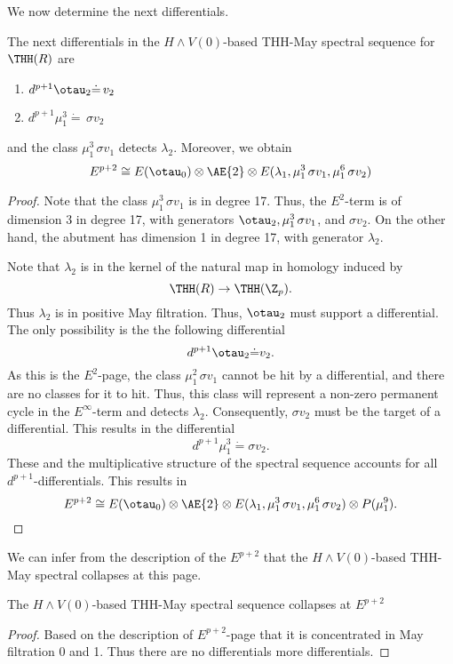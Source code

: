 We now determine the next differentials. 

\begin{prop}
	The next differentials in the $H\wedge V(0)$-based THH-May spectral sequence for $\THH(R)$ are 
	\begin{enumerate}
		\item $d^{p+1}\otau_2\dot{=}\, v_2$
		\item $d^{p+1}\mu_1^3\dot{=}\, \sigma v_2$
	\end{enumerate}
	and the class $\mu_1^3\, \sigma v_1$ detects $\lambda_2$. Moreover, we obtain
	\[
	E^{p+2}\cong E(\otau_0)\otimes \AE{2}\otimes E(\lambda_1, \mu_1^3\, \sigma v_1, \mu_1^6\, \sigma v_2)
	\]
\end{prop}
\begin{proof}
	Note that the class $\mu_1^3\, \sigma v_1$ is in degree 17. Thus, the $E^2$-term is of dimension 3 in degree 17, with generators $\otau_2, \mu_1^3\, \sigma v_1$, and $\sigma v_2$. On the other hand, the abutment has dimension 1 in degree 17, with generator $\lambda_2$. 

Note that $\lambda_2$ is in the kernel of the natural map in homology induced by 
\[
\THH(R)\to \THH(\Z_p).
\]
Thus $\lambda_2$ is in positive May filtration. Thus, $\otau_2$ must support a differential. The only possibility is the the following differential
\[
d^{p+1}\otau_2\dot{=} v_2.
\]
As this is the $E^2$-page, the class $\mu_1^2\, \sigma v_1$ cannot be hit by a differential, and there are no classes for it to hit. Thus, this class will represent a non-zero permanent cycle in the $E^\infty$-term and detects $\lambda_2$. Consequently, $\sigma v_2$ must be the target of a differential. This results in the differential 
\[
d^{p+1}\mu_1^3\dot{=} \sigma v_2.
\] 
These and the multiplicative structure of the spectral sequence accounts for all $d^{p+1}$-differentials. This results in 
\[
E^{p+2}\cong E(\otau_0)\otimes \AE{2}\otimes E(\lambda_1, \mu_1^3\, \sigma v_1, \mu_1^6\, \sigma v_2 )\otimes P(\mu_1^9).
\]
\end{proof}

We can infer from the description of the $E^{p+2}$ that the $H\wedge V(0)$-based THH-May spectral collapses at this page. 

\begin{cor}
	The $H\wedge V(0)$-based THH-May spectral sequence collapses at $E^{p+2}$
\end{cor}
\begin{proof}
	Based on the description of $E^{p+2}$-page that it is concentrated in May filtration 0 and 1. Thus there are no differentials more differentials.
\end{proof}

